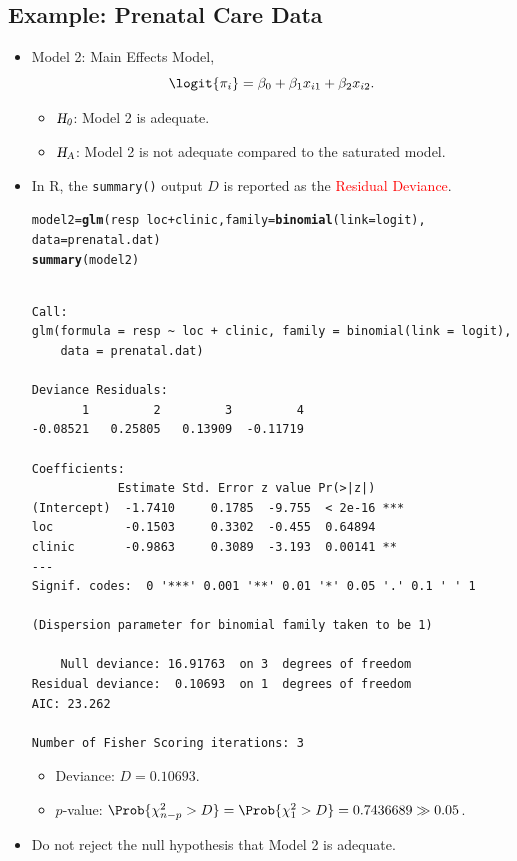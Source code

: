 \documentclass{article}\usepackage[]{graphicx}\usepackage[svgnames]{xcolor}
\makeatletter
\newcommand{\hlopt}[1]{\textcolor[rgb]{0,0,0}{#1}}%
\newcommand{\hlstd}[1]{\textcolor[rgb]{0.345,0.345,0.345}{#1}}%
\newcommand{\hlkwb}[1]{\textcolor[rgb]{0.69,0.353,0.396}{#1}}%
\newcommand{\hlkwc}[1]{\textcolor[rgb]{0.333,0.667,0.333}{#1}}%
\newcommand{\hlkwd}[1]{\textcolor[rgb]{0.737,0.353,0.396}{\textbf{#1}}}%
\newenvironment{kframe}{%
 \def\at@end@of@kframe{}%
 \ifinner\ifhmode%
  \def\at@end@of@kframe{\end{minipage}}%
  \begin{minipage}{\columnwidth}%
 \fi\fi%
 \def\FrameCommand##1{\hskip\@totalleftmargin \hskip-\fboxsep
 \colorbox{shadecolor}{##1}\hskip-\fboxsep
     \hskip-\linewidth \hskip-\@totalleftmargin \hskip\columnwidth}%
 \MakeFramed {\advance\hsize-\width
   \@totalleftmargin\z@ \linewidth\hsize
   \@setminipage}}%
 {\par\unskip\endMakeFramed%
 \at@end@of@kframe}
\newenvironment{knitrout}{}{} %
\newcommand{\HN}{\textsl{H}_{\textsl{0}}}%
\newcommand{\HA}{\textsl{H}_{\textsl{A}}}%
\makeatother
\begin{document}
\subsection*{Example: Prenatal Care Data}
\begin{itemize}
      \item Model 2: Main Effects Model,
            \[ \logit{\pi_i}=\beta_0+\beta_1x_{i1}+\beta_2x_{i2}. \]
            \begin{itemize}
                  \item $ \HN $: Model 2 is adequate.
                  \item $ \HA $: Model 2 is not adequate compared to the saturated model.
            \end{itemize}
      \item In R, the \texttt{summary()} output $ D $ is reported as the \textcolor{Red}{Residual Deviance}.
\begin{knitrout}
\color{fgcolor}\begin{kframe}
\begin{alltt}
\hlstd{model2} \hlkwb{=} \hlkwd{glm}\hlstd{(resp} \hlopt{~} \hlstd{loc} \hlopt{+} \hlstd{clinic,} \hlkwc{family} \hlstd{=} \hlkwd{binomial}\hlstd{(}\hlkwc{link} \hlstd{= logit),}
  \hlkwc{data} \hlstd{= prenatal.dat)}
\hlkwd{summary}\hlstd{(model2)}
\end{alltt}
\begin{verbatim}

Call:
glm(formula = resp ~ loc + clinic, family = binomial(link = logit), 
    data = prenatal.dat)

Deviance Residuals: 
       1         2         3         4  
-0.08521   0.25805   0.13909  -0.11719  

Coefficients:
            Estimate Std. Error z value Pr(>|z|)    
(Intercept)  -1.7410     0.1785  -9.755  < 2e-16 ***
loc          -0.1503     0.3302  -0.455  0.64894    
clinic       -0.9863     0.3089  -3.193  0.00141 ** 
---
Signif. codes:  0 '***' 0.001 '**' 0.01 '*' 0.05 '.' 0.1 ' ' 1

(Dispersion parameter for binomial family taken to be 1)

    Null deviance: 16.91763  on 3  degrees of freedom
Residual deviance:  0.10693  on 1  degrees of freedom
AIC: 23.262

Number of Fisher Scoring iterations: 3
\end{verbatim}
\end{kframe}
\end{knitrout}
            \begin{itemize}
                  \item Deviance: $ D=0.10693 $.
                  \item $ p $-value: $ \Prob{\chi^2_{n-p}>D}=\Prob{\chi^2_1>D}=0.7436689\gg 0.05 $.
            \end{itemize}
      \item Do not reject the null hypothesis that Model 2 is adequate.
\end{itemize}
\end{document}
